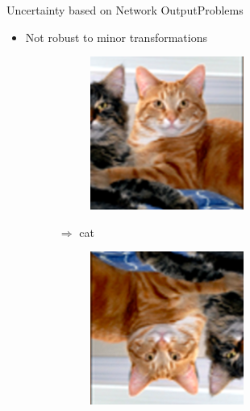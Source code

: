 \documentclass{beamer}
\begin{document}
\begin{frame}{Uncertainty based on Network Output}{Problems}
\begin{itemize}
\begin{figure}[H]
\begin{subfigure}{.1\textwidth}
		\end{subfigure} $\Rightarrow$ dog
	\end{figure}
	\item Not robust to minor transformations
	\begin{figure}[H]
		\centering
		\begin{subfigure}{.1\textwidth}
			\includegraphics[width=\textwidth]{cat} 
		\end{subfigure} $\Rightarrow$ cat \hspace{1cm}
		\begin{subfigure}{.1\textwidth}
			\includegraphics[width=\textwidth]{cat_notrobust}

\end{subfigure}
\end{figure}
\end{itemize}
\end{frame}
\end{document}
